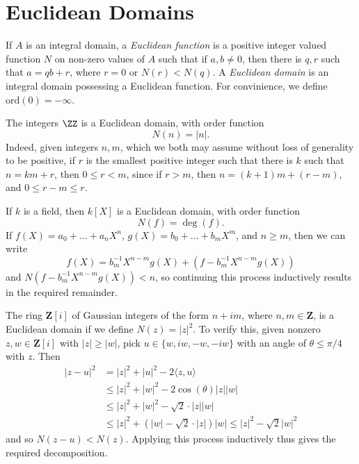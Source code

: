 \section{Euclidean Domains}

If $A$ is an integral domain, a \emph{Euclidean function} is a positive integer valued function $N$ on non-zero values of $A$ such that if $a,b \neq 0$, then there is $q,r$ such that $a = qb + r$, where $r = 0$ or $N(r) < N(q)$. A \emph{Euclidean domain} is an integral domain possessing a Euclidean function. For convinience, we define $\text{ord}(0) = -\infty$.

\begin{example}
    The integers $\ZZ$ is a Euclidean domain, with order function
    \[ N(n) = |n|. \]
    Indeed, given integers $n,m$, which we both may assume without loss of generality to be positive, if $r$ is the smallest positive integer such that there is $k$ such that $n = km + r$, then $0 \leq r < m$, since if $r > m$, then $n = (k+1)m + (r - m)$, and $0 \leq r-m \leq r$.
\end{example}

\begin{example}
    If $k$ is a field, then $k[X]$ is a Euclidean domain, with order function
    \[ N(f) = \deg(f). \]
    If $f(X) = a_0 + \dots + a_nX^n$, $g(X) = b_0 + \dots + b_mX^m$, and $n \geq m$, then we can write
    \[ f(X) = b_m^{-1} X^{n-m} g(X) + (f - b_m^{-1} X^{n-m}g(X)) \]
    and $N(f - b_m^{-1} X^{n-m}g(X)) < n$, so continuing this process inductively results in the required remainder.
\end{example}

\begin{example}
    The ring $\mathbf{Z}[i]$ of Gaussian integers of the form $n + im$, where $n,m \in \mathbf{Z}$, is a Euclidean domain if we define $N(z) = |z|^2$. To verify this, given nonzero $z,w \in \mathbf{Z}[i]$ with $|z| \geq |w|$, pick $u \in \{ w, iw, -w, -iw \}$ with an angle of $\theta \leq \pi/4$ with $z$. Then
    \begin{align*}
        |z - u|^2 &= |z|^2 + |u|^2 - 2 \langle z, u \rangle\\
        &\leq |z|^2 + |w|^2 - 2 \cos(\theta) |z||w|\\
        &\leq |z|^2 + |w|^2 - \sqrt{2} \cdot |z||w|\\
        &\leq |z|^2 + (|w| - \sqrt{2} \cdot |z|) |w| \leq |z|^2 - \sqrt{2} |w|^2
    \end{align*}
    and so $N(z-u) < N(z)$. Applying this process inductively thus gives the required decomposition.
\end{example}

